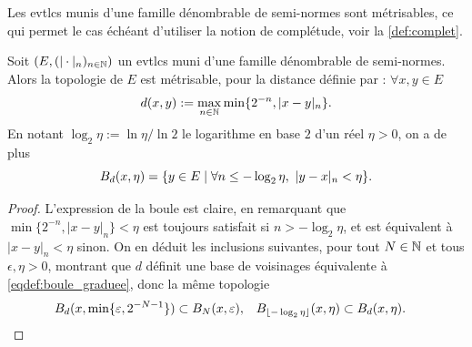 Les evtlcs munis d'une famille dénombrable de semi-normes sont métrisables, ce qui permet le cas échéant d'utiliser la notion de complétude, voir la \cref{def:complet}.
\begin{proposition}
\label{prop:distanceEvtlcs}
%
Soit $(E,(|\cdot|_n)_{n \in \mathbb{N}})$ un evtlcs muni d'une famille dénombrable de semi-normes. Alors la topologie de $E$ est métrisable, pour la distance définie par : $\forall x,y \in E$ 
\begin{equation}
\label{eqdef:evtlc_dist}
	d(x,y) := \max_{n \in \bN} \min\{2^{-n}, |x-y|_n\}.
\leancheck{eqdef:evtlc_dist}%
\end{equation}
En notant $\log_2 \eta := \ln \eta/ \ln 2$ le logarithme en base $2$ d'un réel $\eta>0$, on a de plus
\begin{equation*}
\label{eq:boule_evtlc}
	B_d(x,\eta) = \{y \in E \mid \forall n \leq -\log_2 \eta,\ |y-x|_n < \eta\}.
\leancheck{eq:boule_evtlc}%
\end{equation*}
\end{proposition}

\begin{proof}
L'expression de la boule est claire, en remarquant que $\min\{2^{-n},|x-y|_n\}<\eta$ est toujours satisfait si $n > -\log_2 \eta$, et est équivalent à $|x-y|_n < \eta$ sinon. 
On en déduit les inclusions suivantes, pour tout $N \in \mathbb{N}$ et tous $\epsilon,\eta>0$, montrant que $d$ définit une base de voisinages équivalente à \eqref{eqdef:boule_graduee}, donc la même topologie
\belowdisplayskip=-12pt
\begin{align*}
	B_d(x, \min \{\varepsilon,2^{-N-1}\}) &\subset B_N(x,\varepsilon), &
	B_{\lfloor -\log_2 \eta \rfloor}(x,\eta) &\subset B_d(x,\eta). 
\end{align*}
\end{proof}

%

